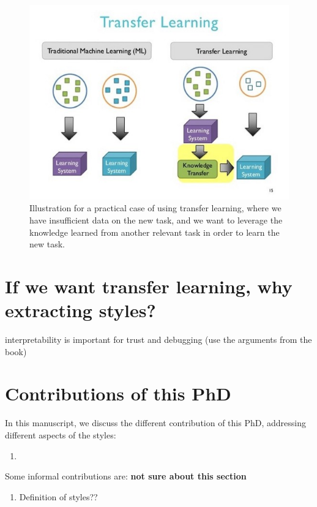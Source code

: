 \begin{figure}
  \includegraphics[scale=0.8]{./images/introduction/transfer_learning_illustration.jpeg}
  \caption{Illustration for a practical case of using transfer learning, where we have insufficient data on the new task, and we want to leverage the knowledge learned from another relevant task in order to learn the new task.}
  \label{fig:illustrate_TL}
\end{figure}
\section{If we want transfer learning, why extracting styles?}
  \par interpretability is important for trust and debugging (use the arguments from the book)


\section{Contributions of this PhD}
\par In this manuscript, we discuss the different contribution of this PhD, addressing different aspects of the styles:
\begin{enumerate}
  \item
\end{enumerate}
Some informal contributions are: \textbf{not sure about this section}
\begin{enumerate}
  \item Definition of styles??
\end{enumerate}

